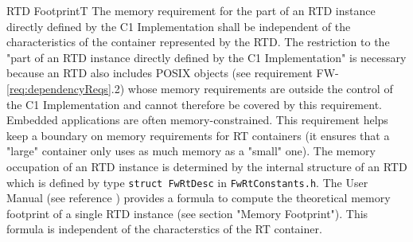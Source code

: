 \documentclass[requirements]{../fwprofile}
\begin{document}
\begin{fw_req_note}{RTD Footprint}{T}
{The memory requirement for the part of an RTD instance directly defined by the C1 Implementation shall be independent of the characteristics of the container represented by the RTD.}
{The restriction to the "part of an RTD instance directly defined by the C1 Implementation" is necessary because an RTD also includes POSIX objects (see requirement FW-\ref{req:dependencyReqs}.2) whose memory requirements are outside the control of the C1 Implementation and cannot therefore be covered by this requirement.}
{Embedded applications are often memory-constrained. This requirement helps keep a boundary on memory requirements for RT containers (it ensures that a "large" container only uses as much memory as a "small" one).}
{The memory occupation of an RTD instance is determined by the internal structure of an RTD which is defined by type \texttt{struct FwRtDesc} in \texttt{FwRtConstants.h}.} 
{The User Manual (see reference \cite{ref:um}) provides a formula to compute the theoretical memory footprint of a single RTD instance (see section "Memory Footprint"). This formula is independent of the characterstics of the RT container. }
\end{fw_req_note}
\end{document}
